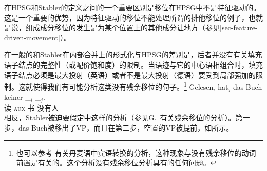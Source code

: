 在HPSG和Stabler的定义之间的一个重要区别是移位在HPSG中不是特征驱动的。这是一个重要的优势，因为特征驱动的移位不能处理所谓的排他移位\citep{Fanselow2003b}的例子，也就是说，组成成分移位的发生是为某个位置上的其他成分让地方（参见\ref{sec-feature-driven-movement}）。

在一般的\xbartc 和Stabler在内部合并上的形式化与HPSG的差别是，后者并没有有关填充语子结点的完整性（或配价饱和度）的限制。当语迹与它的中心语相组合时，填充语子结点必须是最大投射（英语）或者不是最大投射（德语）要受到局部强加的限制。这就使得我们有可能分析这类没有残余移位的句子。\footnote{%
也可以参考 有关丹麦语中宾语转换的分析，这种现象与没有残余移位的动词前置是有关的。这个分析没有残余移位分析具有的任何问题。
}
\addlines[2]
\ea
\gll Gelesen$_i$ hat$_j$ das Buch keiner \_$_i$ \_$_j$.\\
        读 \textsc{aux}  书 没有人\\
\z
相反，Stabler被迫要假定中这样的分析（参见G.\ 
 有关残余移位的分析）。第一步，das Buch被移出了VP，而且在第二步，空置的VP被提前，如所示。
